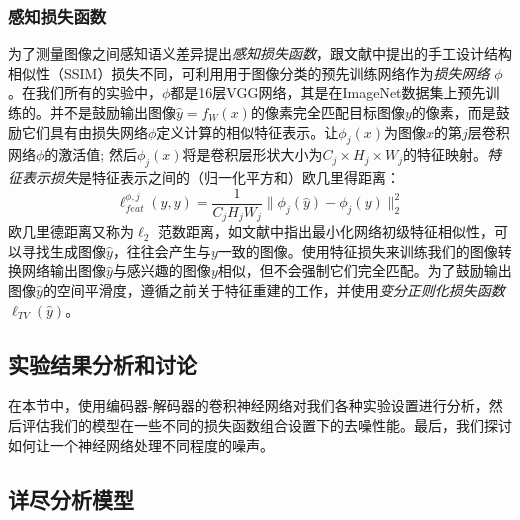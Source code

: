 \subsubsection{感知损失函数}

为了测量图像之间感知语义差异提出\emph{感知损失函数}，跟文献中提出的手工设计结构相似性（SSIM）损失不同，可利用用于图像分类的预先训练网络作为\emph{损失网络} $ \phi $。在我们所有的实验中，$ \phi $都是16层VGG网络\cite{Simonyan2014a}，其是在ImageNet数据集\cite{Deng2009ImageNet}上预先训练的。并不是鼓励输出图像$ \hat y = f_W(x)$的像素完全匹配目标图像$ y $的像素，而是鼓励它们具有由损失网络$ \phi $定义计算的相似特征表示。让$ \phi_j(x)$为图像$ x $的第$ j $层卷积网络$ \phi $的激活值; 然后$ \phi_j(x)$将是卷积层形状大小为$ C_j \times H_j \times W_j $的特征映射。\emph{特征表示损失}是特征表示之间的（归一化平方和）欧几里得距离： 
\begin{equation}
  \ell_{feat}^{\phi,j}(\hat y, y) = 
  \frac1{C_jH_jW_j}\|\phi_j(\hat y) - \phi_j(y)\|_2^2
\end{equation}
欧几里德距离又称为$ \ell_{2} $ 范数距离，如文献中指出最小化网络初级特征相似性，可以寻找生成图像$ \hat y $，往往会产生与$ y $一致的图像。使用特征损失来训练我们的图像转换网络输出图像$ \hat y $与感兴趣的图像$ y $相似，但不会强制它们完全匹配。为了鼓励输出图像$ \hat y $的空间平滑度，遵循之前关于特征重建\cite{Mahendran2015}的工作，并使用\emph {变分正则化损失函数} $ \ell_{TV}(\hat y)$。
 
\subsection{实验结果分析和讨论}
\label{sec:experiments-results}

在本节中，使用编码器-解码器的卷积神经网络对我们各种实验设置进行分析，然后评估我们的模型在一些不同的损失函数组合设置下的去噪性能。最后，我们探讨如何让一个神经网络处理不同程度的噪声。
\subsection{详尽分析模型}

